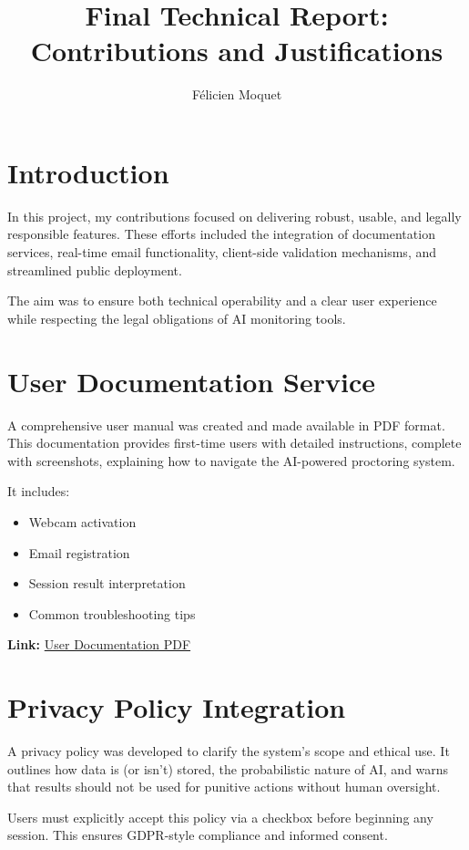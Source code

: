 \documentclass[a4paper,12pt]{article}
\title{Final Technical Report: Contributions and Justifications}
\author{Félicien Moquet}
\date{\vspace{-1.5em}}
\begin{document}
\maketitle
\tableofcontents
\newpage

\section{Introduction}
In this project, my contributions focused on delivering robust, usable, and legally responsible features. These efforts included the integration of documentation services, real-time email functionality, client-side validation mechanisms, and streamlined public deployment.

The aim was to ensure both technical operability and a clear user experience while respecting the legal obligations of AI monitoring tools.

\section{User Documentation Service}
A comprehensive user manual was created and made available in PDF format. This documentation provides first-time users with detailed instructions, complete with screenshots, explaining how to navigate the AI-powered proctoring system.

It includes:
\begin{itemize}
    \item Webcam activation
    \item Email registration
    \item Session result interpretation
    \item Common troubleshooting tips
\end{itemize}

\noindent\textbf{Link:} \href{https://fefe29.github.io/Automated-Online-Test-Monitoring-System_V4/user_doc.pdf}{User Documentation PDF}

\section{Privacy Policy Integration}
A privacy policy was developed to clarify the system’s scope and ethical use. It outlines how data is (or isn’t) stored, the probabilistic nature of AI, and warns that results should not be used for punitive actions without human oversight.

Users must explicitly accept this policy via a checkbox before beginning any session. This ensures GDPR-style compliance and informed consent.
\end{document}
